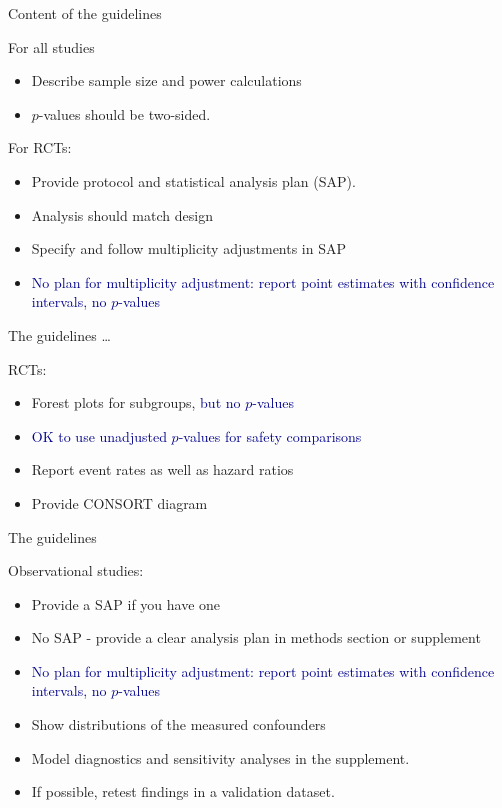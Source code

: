 \documentclass[ignorenonframetext,]{beamer}
\begin{document}
\begin{frame}{Content of the guidelines}
\protect\hypertarget{content-of-the-guidelines}{}

For all studies

\begin{itemize}
\item
  Describe sample size and power calculations
\item
  \(p\)-values should be two-sided.
\end{itemize}

For RCTs:

\begin{itemize}
\item
  Provide protocol and statistical analysis plan (SAP).
\item
  Analysis should match design
\item
  Specify and follow multiplicity adjustments in SAP
\item
  \textcolor{darkblue}{No plan for multiplicity adjustment: report point estimates with confidence intervals, no $p$-values}
\end{itemize}

\end{frame}

\begin{frame}{The guidelines \ldots}
\protect\hypertarget{the-guidelines}{}

RCTs:

\begin{itemize}
\item
  Forest plots for subgroups, \textcolor{darkblue}{but no $p$-values}
\item
  \textcolor{darkblue}{OK to use unadjusted $p$-values for safety comparisons}
\item
  Report event rates as well as hazard ratios
\item
  Provide CONSORT diagram
\end{itemize}

\end{frame}

\begin{frame}{The guidelines}
\protect\hypertarget{the-guidelines-1}{}

Observational studies:

\begin{itemize}
\item
  Provide a SAP if you have one
\item
  No SAP - provide a clear analysis plan in methods section or
  supplement
\item
  \textcolor{darkblue}{No plan for multiplicity adjustment: report point estimates with confidence intervals, no $p$-values}
\item
  Show distributions of the measured confounders
\item
  Model diagnostics and sensitivity analyses in the supplement.
\item
  If possible, retest findings in a validation dataset.
\end{itemize}

\end{frame}
\end{document}
